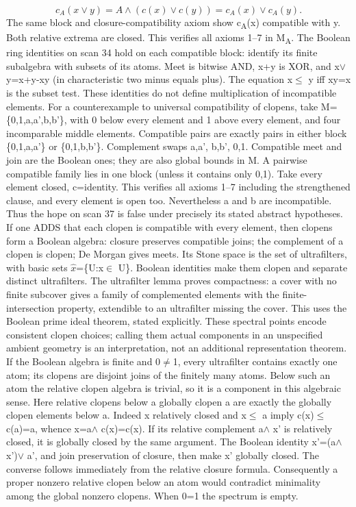 \[c_A(x\vee y)=A\wedge(c(x)\vee c(y))=c_A(x)\vee c_A(y).\]
The same block and closure-compatibility axiom show c\textsubscript{A}(x) compatible with y. Both relative extrema are closed. This verifies all axioms 1--7 in M\textsubscript{A}.
The Boolean ring identities on scan 34 hold on each compatible block: identify its finite subalgebra with subsets of its atoms. Meet is bitwise AND, x+y is XOR, and x$\vee$ y=x+y-xy (in characteristic two minus equals plus). The equation x$\leq$ y iff xy=x is the subset test. These identities do not define multiplication of incompatible elements.
For a counterexample to universal compatibility of clopens, take M=\{0,1,a,a',b,b'\}, with 0 below every element and 1 above every element, and four incomparable middle elements. Compatible pairs are exactly pairs in either block \{0,1,a,a'\} or \{0,1,b,b'\}. Complement swaps a,a', b,b', 0,1. Compatible meet and join are the Boolean ones; they are also global bounds in M. A pairwise compatible family lies in one block (unless it contains only 0,1). Take every element closed, c=identity. This verifies all axioms 1--7 including the strengthened clause, and every element is open too. Nevertheless a and b are incompatible. Thus the hope on scan 37 is false under precisely its stated abstract hypotheses.
If one ADDS that each clopen is compatible with every element, then clopens form a Boolean algebra: closure preserves compatible joins; the complement of a clopen is clopen; De Morgan gives meets. Its Stone space is the set of ultrafilters, with basic sets $\widehat x$=\{U:x$\in$ U\}. Boolean identities make them clopen and separate distinct ultrafilters. The ultrafilter lemma proves compactness: a cover with no finite subcover gives a family of complemented elements with the finite-intersection property, extendible to an ultrafilter missing the cover. This uses the Boolean prime ideal theorem, stated explicitly. These spectral points encode consistent clopen choices; calling them actual components in an unspecified ambient geometry is an interpretation, not an additional representation theorem. If the Boolean algebra is finite and 0$\ne$1, every ultrafilter contains exactly one atom; its clopens are disjoint joins of the finitely many atoms. Below such an atom the relative clopen algebra is trivial, so it is a component in this algebraic sense. Here relative clopens below a globally clopen a are exactly the globally clopen elements below a. Indeed x relatively closed and x$\leq$ a imply c(x)$\leq$ c(a)=a, whence x=a$\wedge$ c(x)=c(x). If its relative complement a$\wedge$ x' is relatively closed, it is globally closed by the same argument. The Boolean identity x'=(a$\wedge$ x')$\vee$ a', and join preservation of closure, then make x' globally closed. The converse follows immediately from the relative closure formula. Consequently a proper nonzero relative clopen below an atom would contradict minimality among the global nonzero clopens. When 0=1 the spectrum is empty.
